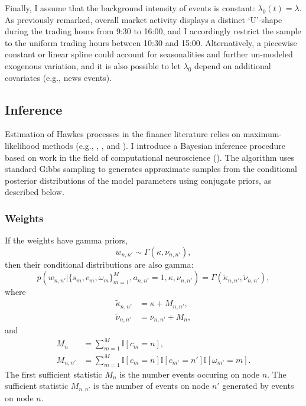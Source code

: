 		Finally, I assume that the background intensity of events is constant: $\lambda_0(t) = \lambda$. As previously remarked, overall market activity displays a distinct `U'-shape during the trading hours from 9:30 to 16:00, and I accordingly restrict the sample to the uniform trading hours between 10:30 and 15:00. Alternatively, a piecewise constant or linear spline could account for seasonalities and further un-modeled exogenous variation, and it is also possible to let $\lambda_0$ depend on additional covariates (e.g., news events).

	\subsection{Inference}
		Estimation of Hawkes processes in the finance literature relies on maximum-likelihood methods (e.g., \cite{Bowsher2007}, \cite{Large2007}, and \cite{Bacry2013}). I introduce a Bayesian inference procedure based on work in the field of computational neuroscience (\cite{Linderman2015}). The algorithm uses standard Gibbs sampling to generates approximate samples from the conditional posterior distributions of the model parameters using conjugate priors, as described below.

		\subsubsection*{Weights}
			If the weights have gamma priors,
			\begin{equation}
				w_{n,n'} \sim \Gamma(\kappa, \nu_{n,n'}),
			\end{equation}
			then their conditional distributions are also gamma:
			\begin{equation}
				p(w_{n,n'} | \{s_m, c_m, \omega_m\}_{m=1}^M, a_{n,n'} = 1, \kappa, \nu_{n,n'}) = \Gamma(\tilde{\kappa}_{n,n'}, \tilde{\nu}_{n,n'}),
			\end{equation}
			where
			\begin{align}
				\tilde{\kappa}_{n,n'} &= \kappa + M_{n,n'}, \\
				\tilde{\nu}_{n,n'} &= \nu_{n,n'} + M_n,
			\end{align}
			and
			\begin{align}
				M_n &= \sum_{m=1}^{M} \mathbb{I}\left[ c_m = n \right], \\
				M_{n,n'} &= \sum_{m=1}^M \mathbb{I}\left[ c_m = n \right] \mathbb{I}\left[ c_{m'} = n' \right] \mathbb{I}\left[ \omega_{m'} = m \right].
			\end{align}
			The first sufficient statistic $M_n$ is the number events occuring on node $n$. The sufficient statistic $M_{n,n'}$ is the number of events on node $n'$ generated by events on node $n$.

